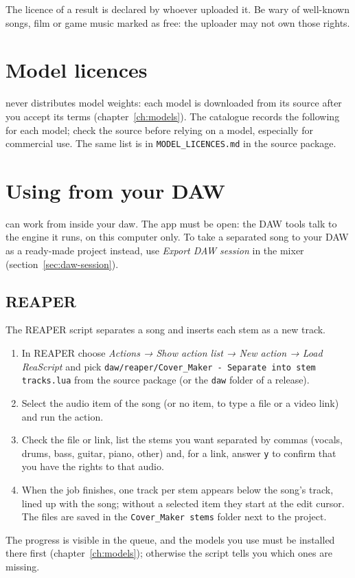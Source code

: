 \documentclass{covermaker}
\begin{document}
The licence of a result is declared by whoever uploaded it. Be wary of
well-known songs, film or game music marked as free: the uploader may not own
those rights.

\appendix
\chapter{Model licences}\label{app:model-licences}
\CM{} never distributes model weights: each model is downloaded from its
source after you accept its terms (chapter~\ref{ch:models}). The catalogue
records the following for each model; check the source before relying on a
model, especially for commercial use. The same list is in
\texttt{MODEL\_LICENCES.md} in the source package.

{\small

}

\chapter{Using \CM{} from your DAW}\label{ch:daw}
\CM{} can work from inside your \gls{daw}. The app must be open: the DAW tools
talk to the engine it runs, on this computer only.
To take a separated song to your DAW as a ready-made project instead, use
\emph{Export DAW session} in the mixer (section~\ref{sec:daw-session}).

\section{REAPER}
The REAPER script separates a song and inserts each stem as a new track.
\begin{enumerate}
  \item In REAPER choose \emph{Actions → Show action list → New action → Load
        ReaScript} and pick
        \texttt{daw/reaper/Cover\_Maker - Separate into stem tracks.lua} from the
        \CM{} source package (or the \texttt{daw} folder of a release).
  \item Select the audio item of the song (or no item, to type a file or a
        video link) and run the action.
  \item Check the file or link, list the stems you want separated by commas
        (vocals, drums, bass, guitar, piano, other) and, for a link, answer
        \texttt{y} to confirm that you have the rights to that audio.
  \item When the job finishes, one track per stem appears below the song's
        track, lined up with the song; without a selected item they start at the
        edit cursor. The files are saved in the \texttt{Cover\_Maker stems}
        folder next to the project.
\end{enumerate}
The progress is visible in the \CM{} queue, and the models you use must be
installed there first (chapter~\ref{ch:models}); otherwise the script tells
you which ones are missing.
\end{document}
